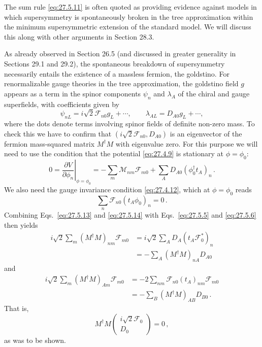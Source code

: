 The sum rule \eqref{eq:27.5.11} is often quoted as providing evidence
against models in which supersymmetry is spontaneously broken in the tree
approximation within the minimum supersymmetric extension of the standard
model. We will discuss this along with other arguments in Section 28.3.

As already observed in Section 26.5 (and discussed in greater generality in
Sections 29.1 and 29.2), the spontaneous breakdown of supersymmetry
necessarily entails the existence of a massless fermion, the goldstino. For
renormalizable gauge theories in the tree approximation, the goldstino field
\(g\) appears as a term in the spinor components \(\psi_n\) and \(\lambda_A\)
of the chiral and gauge superfields, with coefficients given by
\begin{equation}
  \psi_{nL}=i\sqrt{2}\mathcal{F}_{n0}g_L+\cdots,
  \qquad
  \lambda_{AL}=D_{A0}g_L+\cdots,
  \tag{27.5.12}\label{eq:27.5.12}
\end{equation}
where the dots denote terms involving spinor fields of definite non-zero
mass. To check this we have to confirm that
\((i\sqrt{2}\mathcal{F}_{n0},D_{A0})\) is an eigenvector of the fermion
mass-squared matrix \(M^\dagger M\) with eigenvalue zero. For this purpose we
will need to use the condition that the potential \eqref{eq:27.4.9} is
stationary at \(\phi=\phi_0\):
\begin{equation}
  0
  =\left.\frac{\partial V}{\partial\phi_n}\right|_{\phi=\phi_0}
  =-\sum_m\mathcal{M}_{nm}\mathcal{F}_{m0}
  +\sum_A D_{A0}(\phi_0^\dagger t_A)_n\,.
  \tag{27.5.13}\label{eq:27.5.13}
\end{equation}
We also need the gauge invariance condition \eqref{eq:27.4.12}, which at
\(\phi=\phi_0\) reads
\begin{equation}
  \sum_n\mathcal{F}_{n0}(t_A\phi_0)_n=0\,.
  \tag{27.5.14}\label{eq:27.5.14}
\end{equation}
Combining Eqs.~\eqref{eq:27.5.13} and \eqref{eq:27.5.14} with
Eqs.~\eqref{eq:27.5.5} and \eqref{eq:27.5.6} then yields
\begin{equation}
  \begin{aligned}
  i\sqrt{2}\sum_m(M^\dagger M)_{nm}\mathcal{F}_{m0}
  &=i\sqrt{2}\sum_A D_A(t_A\mathcal{F}_0^*)_n
  \\
  &=-\sum_A(M^\dagger M)_{nA}D_{A0}
  \end{aligned}
  \tag{27.5.15}\label{eq:27.5.15}
\end{equation}
and
\begin{equation}
  \begin{aligned}
  i\sqrt{2}\sum_m(M^\dagger M)_{Am}\mathcal{F}_{m0}
  &=-2\sum_{nm}\mathcal{F}_{n0}(t_A)_{nm}\mathcal{F}_{m0}
  \\
  &=-\sum_B(M^\dagger M)_{AB}D_{B0}\,.
  \end{aligned}
  \tag{27.5.16}\label{eq:27.5.16}
\end{equation}
That is,
\begin{equation}
  M^\dagger M
  \begin{pmatrix}
    i\sqrt{2}\mathcal{F}_0\\
    D_0
  \end{pmatrix}
  =0\,,
  \tag{27.5.17}\label{eq:27.5.17}
\end{equation}
as was to be shown.
